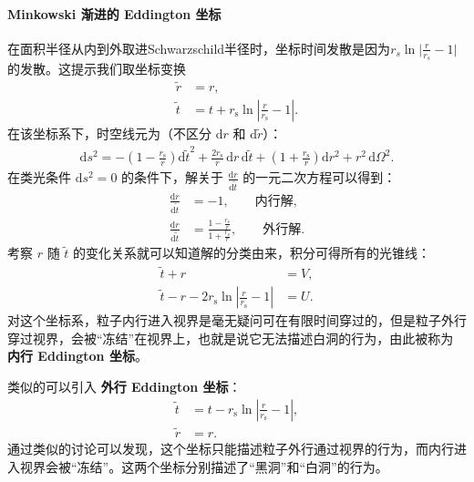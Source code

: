 \paragraph{Minkowski 渐进的 Eddington 坐标}
在面积半径从内到外取进Schwarzschild半径时，坐标时间发散是因为$r_s\ln{|\frac{r}{r_s}-1}|$的发散。这提示我们取坐标变换
\begin{align}
    \widetilde{r} &= r, \\
    \widetilde{t} &= t + r_{\mathrm{s}} \ln\left|\frac{r}{r_{\mathrm{s}}} - 1\right|.
\end{align}
在该坐标系下，时空线元为（不区分 $\mathrm{d}r$ 和 $\mathrm{d}\widetilde{r}$）：
\begin{align}
    \mathrm{d}s^{2}
    = -\left(1 - \frac{r_{\mathrm{s}}}{r}\right)\mathrm{d}\widetilde{t}^{2}
    + \frac{2r_{\mathrm{s}}}{r}\,\mathrm{d}r\,\mathrm{d}\widetilde{t}
    + \left(1+\frac{r_{\mathrm{s}}}{r}\right)\mathrm{d}r^{2}
    + r^{2}\,\mathrm{d}\Omega^{2}.
\end{align}
在类光条件 $\mathrm{d}s^{2} = 0$ 的条件下，解关于 $\frac{\mathrm{d}r}{\mathrm{d}\widetilde{t}}$ 的一元二次方程可以得到：
\begin{align}
    \frac{\mathrm{d}r}{\mathrm{d}\widetilde{t}} &= -1, \qquad \text{内行解},\\
    \frac{\mathrm{d}r}{\mathrm{d}\widetilde{t}} &= \frac{1 - \frac{r_{\mathrm{s}}}{r}}{1+\frac{r_{\mathrm{s}}}{r}}, \qquad \text{外行解}.
\end{align}
考察 $r$ 随 $\widetilde{t}$ 的变化关系就可以知道解的分类由来，积分可得所有的光锥线：
\begin{align}
    \widetilde{t} + r &= V, \\
    \widetilde{t} - r - 2r_{\mathrm{s}}\ln\left|\frac{r}{r_{\mathrm{s}}} -1\right| &= U.
\end{align}
对这个坐标系，粒子内行进入视界是毫无疑问可在有限时间穿过的，但是粒子外行穿过视界，会被“冻结”在视界上，也就是说它无法描述白洞的行为，由此被称为 \textbf{内行 Eddington 坐标}。

类似的可以引入 \textbf{外行 Eddington 坐标}：
\begin{align}
    \widetilde{t} &= t - r_{\mathrm{s}} \ln\left|\frac{r}{r_{\mathrm{s}}} - 1\right|, \\
    \widetilde{r} &= r .
\end{align}
通过类似的讨论可以发现，这个坐标只能描述粒子外行通过视界的行为，而内行进入视界会被“冻结”。这两个坐标分别描述了“黑洞”和“白洞”的行为。

